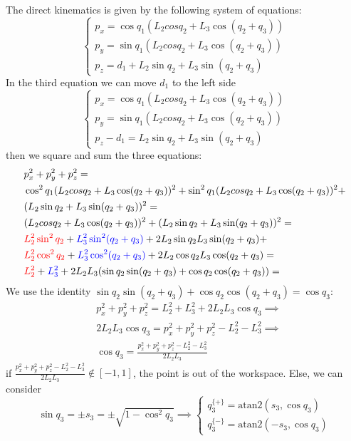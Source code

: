 \documentclass[10pt, letterpaper]{report}
\begin{document}
The direct kinematics is given by the following system of equations:\begin{equation}
    \begin{cases}
        p_x=\cos q_1(L_2cos q_2+L_3\cos(q_2+q_3))\\ 
        p_y=\sin q_1(L_2cos q_2+L_3\cos(q_2+q_3))\\ 
        p_z=d_1+L_2\sin q_2+L_3\sin(q_2+q_3)
    \end{cases}
\end{equation}
In the third equation we can move $d_1$ to the left side 
\begin{equation}
    \begin{cases}
        p_x=\cos q_1(L_2cos q_2+L_3\cos(q_2+q_3))\\ 
        p_y=\sin q_1(L_2cos q_2+L_3\cos(q_2+q_3))\\ 
        p_z-d_1=L_2\sin q_2+L_3\sin(q_2+q_3)
    \end{cases}
\end{equation}
then we square and sum the three equations:
\begin{align}
   &p^2_x+p_y^2+p_z^2 = \\
   &\cos^2 q_1(L_2cos q_2+L_3\cos(q_2+q_3))^2+
   \sin^2 q_1(L_2cos q_2+ L_3\cos(q_2+q_3))^2+\\ &
   (L_2\sin q_2+L_3\sin(q_2+q_3))^2=\\ 
   &(L_2cos q_2+L_3\cos(q_2+q_3))^2+
   (L_2\sin q_2+L_3\sin(q_2+q_3))^2=\\ 
   &\color{red}L_2^2\sin^2 q_2\color{black}+\color{blue}L^2_3\sin^2(q_2+q_3)\color{black}+2L_2\sin q_2L_3\sin(q_2+q_3)+\\
   &\color{red}L_2^2\cos^2 q_2\color{black}+\color{blue}L^2_3\cos^2(q_2+q_3)\color{black}+2L_2\cos q_2L_3\cos(q_2+q_3)=\\ 
   &\color{red}L_2^2\color{black}+\color{blue}L_3^2\color{black}+2L_2L_3(\sin q_2\sin(q_2+q_3)+\cos q_2\cos(q_2+q_3))=\end{align}
We use the identity $\sin q_2\sin(q_2+q_3)+\cos q_2\cos(q_2+q_3)=\cos q_3$:
   \begin{align}
   &p^2_x+p_y^2+p_z^2 =L_2^2+L_3^2+2L_2L_3\cos q_3\implies \\ 
   &2L_2L_3\cos q_3=p^2_x+p_y^2+p_z^2-L_2^2-L_3^2 \implies \\ 
   &\cos q_3=\frac{p^2_x+p_y^2+p_z^2-L_2^2-L_3^2}{2L_2L_3}
\end{align}
if  $\frac{p^2_x+p_y^2+p_z^2-L_2^2-L_3^2}{2L_2L_3}\notin [-1,1]$, the point is out of the workspace. Else, we can consider \begin{equation}
     \sin q_3 = \pm s_3 = \pm\sqrt{1-\cos^2 q_3}\implies \begin{cases}
        q_3^{\{+\}}=\text{atan2}(s_3,\cos q_3)\\
         q_3^{\{-\}}=\text{atan2}(-s_3,\cos q_3)
    \end{cases}
\end{equation} 
\end{document}
